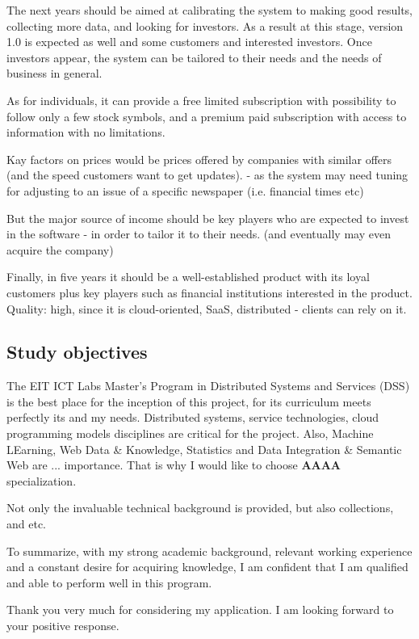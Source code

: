 \documentclass[a4paper,12pt]{article}
\begin{document}
The next years should be aimed at calibrating the system to making good results, collecting more data, and looking for investors. As a result at this stage, version 1.0 is expected as well and some customers and interested investors. Once investors appear, the system can be tailored to their needs and the needs of business in general.

As for individuals, it can provide a free limited subscription with possibility to follow only a few stock symbols, and a premium paid subscription with access to information with no limitations. 

Kay factors on prices would be prices offered by companies with similar offers (and the speed customers want to get updates). - as the system may need tuning for adjusting to an issue of a specific newspaper (i.e. financial times etc)

But the major source of income should be key players who are expected to invest in the software - in order to tailor it to their needs. (and eventually may even acquire the company)

Finally, in five years it should be a well-established product with its loyal customers plus key players such as financial institutions interested in the product. 
Quality: high, since it is cloud-oriented, SaaS, distributed - clients can rely on it.


\subsection*{Study objectives}

The EIT ICT Labs Master's Program in Distributed Systems and Services (DSS) is the best place for the inception of this project, for its curriculum meets perfectly its and my needs. Distributed systems, service technologies, cloud programming models disciplines are critical for the project. Also, Machine LEarning, Web Data \& Knowledge, Statistics and Data Integration \& Semantic Web are ... importance. That is why I would like to choose \textbf{AAAA} specialization. 

Not only the invaluable technical background is provided, but also collections, and etc.

To summarize, with my strong academic background, relevant working experience and a constant desire for acquiring knowledge, I am confident that I am qualified and able to perform well in this program.

Thank you very much for considering my application. I am looking forward to your positive response.
\end{document}
